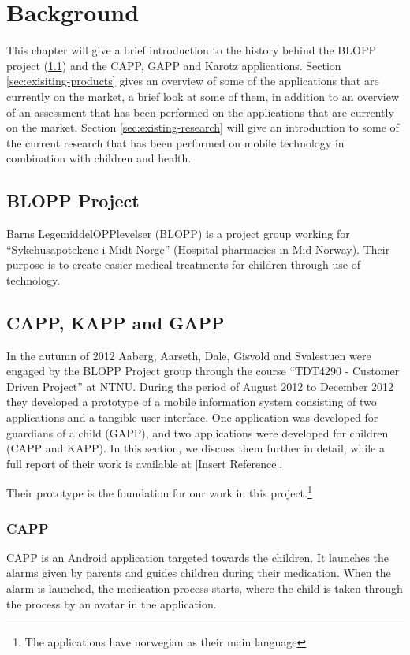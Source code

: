 \chapter{Background}
\label{chp:background}


This chapter will give a brief introduction to the history behind the BLOPP project (\ref{sec:bloppproject}) and the CAPP, GAPP and Karotz applications. 
Section \ref{sec:exisiting-products} gives an overview of some of the applications that are currently on the market, a brief look at some of them, in addition to an overview of an assessment that has been performed on the applications that are currently on the market.   
Section \ref{sec:existing-research} will give an introduction to some of the current research that has been performed on mobile technology in combination with children and health.   


\section{BLOPP Project}
\label{sec:bloppproject}
Barns LegemiddelOPPlevelser (BLOPP) is a project group working for ``Sykehusapotekene i Midt-Norge'' (Hospital pharmacies in Mid-Norway). Their purpose is to create easier medical treatments for children through use of technology.

\section{CAPP, KAPP and GAPP}
\label{sec:cappgappkapp}
In the autumn of 2012 Aaberg, Aarseth, Dale, Gisvold and Svalestuen were engaged by the BLOPP Project group through the course ``TDT4290 - Customer Driven Project'' \cite{customerdrivenntnu} at NTNU. During the period of August 2012 to December 2012 they developed a prototype of a mobile information system consisting of two applications and a tangible user interface. One application was developed for guardians of a child (GAPP), and two applications were developed for children (CAPP and KAPP). In this section, we discuss them further in detail, while a full report of their work is available at [Insert Reference].

Their prototype is the foundation for our work in this project.\footnote{The applications have norwegian as their main language} %

\subsection{CAPP}
CAPP is an Android application targeted towards the children. It launches the alarms given by parents and guides children during their medication. When the alarm is launched, the medication process starts, where the child is taken through the process by an avatar in the application. 


